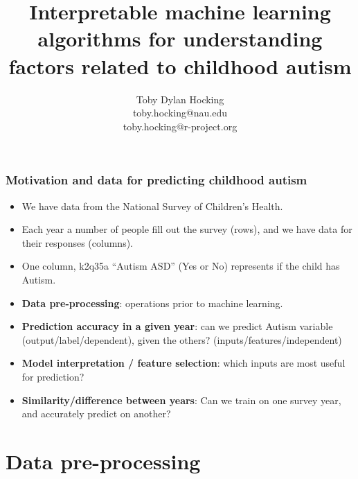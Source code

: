 \documentclass{beamer}
\begin{document}
\title{Interpretable machine learning algorithms for understanding factors related to childhood autism}

\author{
  Toby Dylan Hocking\\
  toby.hocking@nau.edu\\
  toby.hocking@r-project.org\\
}

\maketitle

\begin{frame}
  \frametitle{Motivation and data for predicting childhood autism}
  \begin{itemize}
  \item We have data from the National Survey of Children's Health.
  \item Each year a number of people fill out the survey (rows), and
    we have data for their responses (columns).
  \item One column, k2q35a ``Autism ASD'' (Yes or No) represents if
    the child has Autism.
  \item \textbf{Data pre-processing}: operations prior to machine
    learning.
  \item \textbf{Prediction accuracy in a given year}: can we predict
    Autism variable (output/label/dependent), given the others?
    (inputs/features/independent)
  \item \textbf{Model interpretation / feature selection}: which
    inputs are most useful for prediction?
  \item \textbf{Similarity/difference between years}: Can we train
    on one survey year, and accurately predict on another?
  \end{itemize}
\end{frame}

\section{Data pre-processing}
\end{document}

